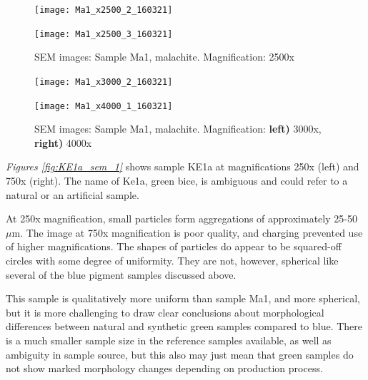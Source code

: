\begin{figure}[H]
\centering
\begin{minipage}{.45\textwidth}
  \centering
  \texttt{[image: Ma1\_x2500\_2\_160321]}
\end{minipage}
\begin{minipage}{.45\textwidth}
  \centering
  \texttt{[image: Ma1\_x2500\_3\_160321]}
\end{minipage}
\caption[SEM images: Sample Ma1, malachite]{SEM images: Sample Ma1, malachite. Magnification: 2500x}
\label{fig:Ma1_sem_3}
\end{figure}

\begin{figure}[H]
\centering
\begin{minipage}{.45\textwidth}
  \centering
  \texttt{[image: Ma1\_x3000\_2\_160321]}
\end{minipage}
\begin{minipage}{.45\textwidth}
  \centering
  \texttt{[image: Ma1\_x4000\_1\_160321]}
\end{minipage}
\caption[SEM images: Sample Ma1, malachite]{SEM images: Sample Ma1, malachite. Magnification: \textbf{left)} 3000x, \textbf{right)} 4000x}
\label{fig:Ma1_sem_4}
\end{figure}


\textit{Figures \ref{fig:KE1a_sem_1}} shows sample KE1a at magnifications 250x (left) and 750x (right). The name of Ke1a, green bice, is ambiguous and could refer to a natural or an artificial sample.

At 250x magnification, small particles form aggregations of approximately 25-50 $\mu$m. The image at 750x magnification is poor quality, and charging prevented use of higher magnifications. The shapes of particles do appear to be squared-off circles with some degree of uniformity.  They are not, however, spherical like several of the blue pigment samples discussed above. 

This sample is qualitatively more uniform than sample Ma1, and more spherical, but it is more challenging to draw clear conclusions about morphological differences between natural and synthetic green samples compared to blue. There is a much smaller sample size in the reference samples available, as well as ambiguity in sample source, but this also may just mean that green samples do not show marked morphology changes depending on production process.

